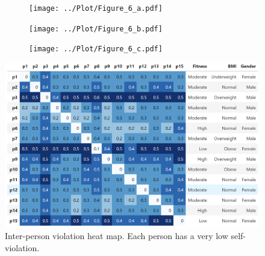 \begin{figure}[t!]
	\centering
	\vspace{-3mm}
	\hspace{-3mm}
	\begin{subfigure}[t]{0.16\textwidth}
		\centering
		\texttt{[image: ../Plot/Figure\_6\_a.pdf]}
	\vspace{-5mm}
	\caption{\phantom{randomrand}}
	\label{fig:har-ml-experiment}
	\end{subfigure}	
	\begin{subfigure}[t]{0.16\textwidth}
		\centering
		\texttt{[image: ../Plot/Figure\_6\_b.pdf]}
	\vspace{-5mm}
	\caption{}
	\label{fig:har-ml-experiment-noise}
	\end{subfigure}	
	\begin{subfigure}[t]{0.16\textwidth}
		\centering
		\texttt{[image: ../Plot/Figure\_6\_c.pdf]}
	\vspace{-5mm}
	\caption{}
	\label{fig:gradual-drift-har}
	\end{subfigure}
	\vspace{-5mm}	
	\caption{(a)~As a higher fraction of mobile activity data is mixed with
sedentary activity data, \dis are violated more, and the classifier's
mean accuracy-drop increases. 
%
(b)~
%
(c)~\system detects the gradual local drift on the
HAR dataset as more people start changing their
activities. In contrast, weighted-PCA (W-PCA) fails to detect drift in absence of
a strong global drift.} 
		\vspace{2mm}	
	\centering
	\includegraphics[width=1\linewidth]{Figures/Figure_7.png}
		\vspace{-7mm}	
	\caption{ Inter-person \invariant violation heat map. Each person has a very low self-violation.}
	\label{fig:har-inter-person-drift-heatmap}
		\vspace{1mm}	
	\centering
\end{figure}

